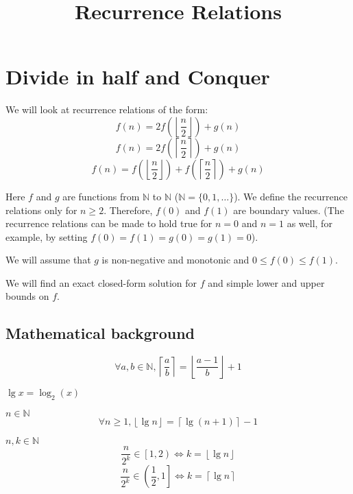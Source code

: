 

\title{Recurrence Relations}

\newcommand*{\floor}[1]{\left\lfloor #1 \right\rfloor}
\newcommand*{\ceil}[1]{\left\lceil #1 \right\rceil}



\maketitle

\initAfterBeginDocument{}

\section{Divide in half and Conquer}

We will look at recurrence relations of the form:
\[ f(n) = 2f\left(\floor{\frac{n}{2}}\right) + g(n) \]
\[ f(n) = 2f\left(\ceil{\frac{n}{2}}\right) + g(n) \]
\[ f(n) = f\left(\floor{\frac{n}{2}}\right) + f\left(\ceil{\frac{n}{2}}\right) + g(n) \]

Here $f$ and $g$ are functions from $\mathbb{N}$ to $\mathbb{N}$ ($\mathbb{N} = \{0, 1, \ldots\}$).
We define the recurrence relations only for $n \ge 2$.
Therefore, $f(0)$ and $f(1)$ are boundary values.
(The recurrence relations can be made to hold true for $n=0$ and $n=1$ as well,
for example, by setting $f(0) = f(1) = g(0) = g(1) = 0$).

We will assume that $g$ is non-negative and monotonic and $0 \le f(0) \le f(1)$.

We will find an exact closed-form solution for $f$ and simple lower and upper bounds on $f$.

\subsection{Mathematical background}

\begin{lemma}
\[ \forall a, b \in \mathbb{N}, \ceil{\frac{a}{b}} = \floor{\frac{a-1}{b}} + 1 \]
\end{lemma}
\begin{definition}$\lg{x} = \log_2(x)$\end{definition}
\begin{lemma} $n \in \mathbb{N}$
\[\forall n \ge 1, \floor{\lg n} = \ceil{\lg(n+1)} - 1 \]
\end{lemma}

\begin{lemma} $n, k \in \mathbb{N}$
\[ \frac{n}{2^k} \in \left[1, 2\right) \iff k = \floor{\lg n} \]
\[ \frac{n}{2^k} \in \left(\frac{1}{2}, 1\right] \iff k = \ceil{\lg n} \]
\end{lemma}


